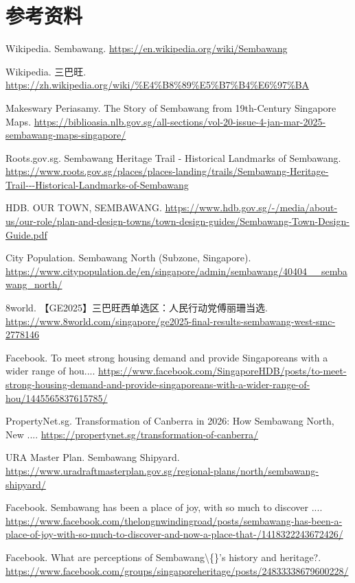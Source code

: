 \documentclass[11pt,a4paper,twoside,openany]{book}
\begin{document}
\section*{参考资料}
\begin{enumerate}[label={[\arabic*]},leftmargin=*,topsep=2pt,itemsep=1pt,parsep=0pt]
  \item Wikipedia. Sembawang. \url{https://en.wikipedia.org/wiki/Sembawang}
  \item Wikipedia. 三巴旺. \url{https://zh.wikipedia.org/wiki/%E4%B8%89%E5%B7%B4%E6%97%BA}
  \item Makeswary Periasamy. The Story of Sembawang from 19th-Century Singapore Maps. \url{https://biblioasia.nlb.gov.sg/all-sections/vol-20-issue-4-jan-mar-2025-sembawang-maps-singapore/}
  \item Roots.gov.sg. Sembawang Heritage Trail - Historical Landmarks of Sembawang. \url{https://www.roots.gov.sg/places/places-landing/trails/Sembawang-Heritage-Trail---Historical-Landmarks-of-Sembawang}
  \item HDB. OUR TOWN, SEMBAWANG. \url{https://www.hdb.gov.sg/-/media/about-us/our-role/plan-and-design-towns/town-design-guides/Sembawang-Town-Design-Guide.pdf}
  \item City Population. Sembawang North (Subzone, Singapore). \url{https://www.citypopulation.de/en/singapore/admin/sembawang/40404__sembawang_north/}
  \item 8world. 【GE2025】三巴旺西单选区：人民行动党傅丽珊当选. \url{https://www.8world.com/singapore/ge2025-final-results-sembawang-west-smc-2778146}
  \item Facebook. To meet strong housing demand and provide Singaporeans with a wider range of hou.... \url{https://www.facebook.com/SingaporeHDB/posts/to-meet-strong-housing-demand-and-provide-singaporeans-with-a-wider-range-of-hou/1445565837615785/}
  \item PropertyNet.sg. Transformation of Canberra in 2026: How Sembawang North, New .... \url{https://propertynet.sg/transformation-of-canberra/}
  \item URA Master Plan. Sembawang Shipyard. \url{https://www.uradraftmasterplan.gov.sg/regional-plans/north/sembawang-shipyard/}
  \item Facebook. Sembawang has been a place of joy, with so much to discover .... \url{https://www.facebook.com/thelongnwindingroad/posts/sembawang-has-been-a-place-of-joy-with-so-much-to-discover-and-now-a-place-that-/1418322243672426/}
  \item Facebook. What are perceptions of Sembawang\textbackslash\{\}'s history and heritage?. \url{https://www.facebook.com/groups/singaporeheritage/posts/24833338679600228/}
\end{enumerate}
\end{document}
